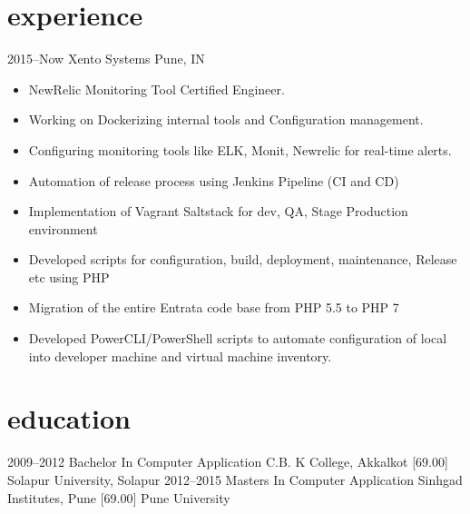 \documentclass[]{cv-style}          %
\begin{document}

\section{experience}

\begin{entrylist}

\entry
  {2015--Now}
  {Xento Systems}
  {Pune, IN}
  {
  
  \begin{itemize}
  \item NewRelic Monitoring Tool Certified Engineer.
  \item Working on Dockerizing internal tools and Configuration management.
  \item Configuring monitoring tools like ELK, Monit, Newrelic for real-time alerts.
  \item Automation of release process using Jenkins Pipeline (CI and CD)
\item Implementation of Vagrant  Saltstack for dev, QA, Stage Production environment
\item Developed scripts for configuration, build, deployment, maintenance, Release etc using PHP
\item Migration of the entire Entrata code base from PHP 5.5 to PHP 7
\item Developed PowerCLI/PowerShell scripts to automate configuration of local into developer machine and virtual machine inventory.
 
  \end{itemize}
  }
\end{entrylist}

\section{education}

\begin{entrylist}

\entry
{2009--2012}
{Bachelor In Computer Application {\normalfont C.B. K College, Akkalkot [69.00]}}
{Solapur University, Solapur}
{\vspace{-0.3cm}}
\entry
{2012--2015}
{Masters In Computer Application {\normalfont Sinhgad Institutes, Pune [69.00]}}
{Pune University}
{ }
\end{entrylist}
\end{document}
